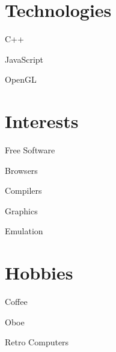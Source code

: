 \documentclass[12pt]{jmichaud-resume}
\begin{document}
	
\noindent\begin{minipage}[t]{5.4cm}
\vspace{10pt}
\vspace{65pt}

\section{Technologies}
\vspace{7pt}
\begin{tightemize}
	\item C++
	\item JavaScript
	\item OpenGL
\end{tightemize}

\vspace{20pt}

\section{Interests}
\vspace{7pt}
\begin{tightemize}
	\item Free Software
	\item Browsers
	\item Compilers
	\item Graphics
	\item Emulation
\end{tightemize}

\vspace{20pt}

\section{Hobbies}
\vspace{7pt}
\begin{tightemize}
	\item Coffee
	\item Oboe
	\item Retro Computers
\end{tightemize}


\end{minipage}
\end{document}

